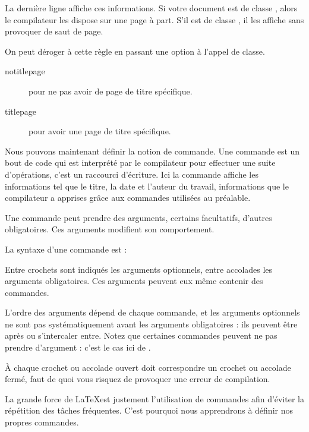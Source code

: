 La dernière ligne affiche ces informations. Si votre document est de classe  , alors le compilateur les dispose sur une page à part. S'il est de classe  , il les affiche sans provoquer de saut de page.

On peut déroger à cette règle en passant une option à l'appel de classe.
\begin{description}
\item[notitlepage] pour ne pas avoir de page de titre spécifique.
\item[titlepage] pour avoir une page de titre spécifique.
\end{description}

Nous pouvons maintenant définir la notion de commande. Une commande  est un bout de code qui est interprété par le compilateur pour effectuer une suite d'opérations, c'est un raccourci d'écriture. 
Ici la commande  affiche les informations tel que le titre, la date et l'auteur du travail, informations que le compilateur a apprises grâce aux commandes utilisées au préalable.

Une commande peut prendre des arguments, certains facultatifs, d'autres obligatoires. Ces arguments  modifient son comportement.


La syntaxe d'une commande est : \label{syntaxecommande}

Entre crochets sont indiqués les arguments optionnels, entre accolades les arguments obligatoires. Ces arguments peuvent eux même contenir des commandes.


L'ordre des arguments dépend de chaque commande, et les arguments optionnels ne sont pas systématiquement avant les arguments obligatoires : ils peuvent être après ou s'intercaler entre. Notez que certaines commandes peuvent ne pas prendre d'argument : c'est le cas ici de .

\begin{attention}
À chaque crochet ou accolade ouvert doit correspondre un crochet ou accolade fermé, faut de quoi vous risquez de provoquer une erreur de compilation.
\end{attention}

La grande force de \LaTeX est justement l'utilisation de commandes afin d'éviter la répétition des tâches fréquentes. C'est pourquoi nous apprendrons à définir nos propres commandes.



